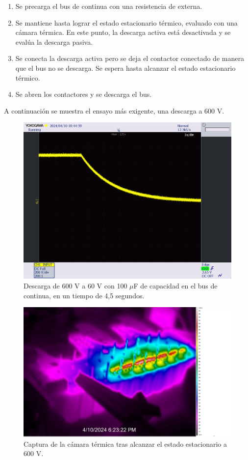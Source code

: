 \begin{enumerate}
	\item Se precarga el bus de continua con una resistencia de externa.
	\item Se mantiene hasta lograr el estado estacionario térmico, evaluado con una cámara térmica. En este punto, la descarga activa está desactivada y se evalúa la descarga pasiva.
	\item Se conecta la descarga activa pero se deja el contactor conectado de manera que el bus no se descarga. Se espera hasta alcanzar el estado estacionario térmico.
	\item Se abren los contactores y se descarga el bus.
\end{enumerate}

A continuación se muestra el ensayo más exigente, una descarga a 600 V.

\begin{figure}[H]
	\centering
	\includegraphics[width=0.7\linewidth]{fig/dischargeGuapo}
	\caption{Descarga de 600 V a 60 V con 100 $\mu$F de capacidad en el bus de continua, en un tiempo de 4,5 segundos.}
\end{figure}

\begin{figure}[H]
	\centering
	\includegraphics[width=0.7\linewidth]{fig/dischargeGuapisimo}
	\caption{Captura de la cámara térmica tras alcanzar el estado estacionario a 600 V.}
\end{figure}



